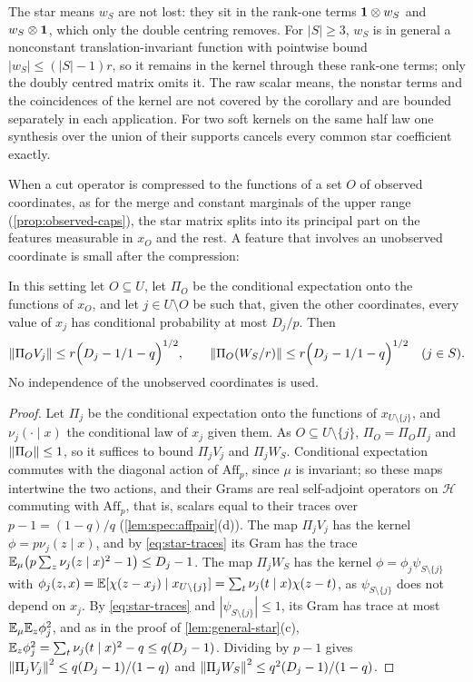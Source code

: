 The star means $w_S$ are not lost: they sit in the rank-one terms $\mathbf 1\otimes w_S$
and $w_S\otimes\mathbf 1$, which only the double centring removes. For $|S|\ge3$, $w_S$ is
in general a nonconstant translation-invariant function with pointwise bound $|w_S|\le(|S|-1)r$, so it remains in the kernel through these rank-one terms; only the
doubly centred matrix omits it. The raw scalar means, the nonstar terms and the
coincidences of the kernel are not covered by the corollary and are bounded
separately in each application. For two soft kernels on the same half law one synthesis over the union of their supports cancels every common
star coefficient exactly.

When a cut operator is compressed to the functions of a set $O$ of observed
coordinates, as for the merge and constant marginals of the upper range
(\cref{prop:observed-caps}), the star matrix splits into its principal part on the
features measurable in $x_O$ and the rest. A feature that involves an unobserved
coordinate is small after the compression:

\begin{lemma}\label{lem:hidden-feature}
In this setting let $O\subseteq U$, let $\Pi_O$ be the conditional expectation onto the
functions of $x_O$, and let $j\in U\setminus O$ be such that, given the other
coordinates, every value of $x_j$ has conditional probability at most $D_j/p$. Then
\[
  \left\|\Pi_OV_j\right\|\le r\Big(D_j-1/1-q\Big)^{1/2},\qquad
  \left\|\Pi_O(W_S/r)\right\|\le r\Big(D_j-1/1-q\Big)^{1/2}\quad(j\in S).
\]
No independence of the unobserved coordinates is used.
\end{lemma}

\begin{proof}
Let $\Pi_j$ be the conditional expectation onto the functions of $x_{U\setminus\{j\}}$, and
$\nu_j(\cdot\mid x)$ the conditional law of $x_j$ given them. As $O\subseteq U\setminus\{j\}$,
$\Pi_O=\Pi_O\Pi_j$ and $\left\|\Pi_O\right\|\le1$, so it suffices to bound $\Pi_jV_j$ and $\Pi_jW_S$.
Conditional expectation commutes with the diagonal action of $\mathrm{Aff}_p$, since
$\mu$ is invariant; so these maps intertwine the two actions, and their Grams are
real self-adjoint operators on $\mathcal H$ commuting with $\mathrm{Aff}_p$, that is,
scalars equal to their traces over $p-1=(1-q)/q$ (\cref{lem:spec:affpair}(d)). The map
$\Pi_jV_j$ has the kernel $\phi=p\nu_j(z\mid x)$, and by \eqref{eq:star-traces} its Gram
has the trace $\mathbb E_\mu\big(p\sum_z\nu_j(z\mid x)^2-1\big)\le D_j-1$. The map $\Pi_jW_S$ has the
kernel $\phi=\phi_j\psi_{S\setminus\{j\}}$ with
$\phi_j(z,x)=\mathbb E[\chi(z-x_j)\mid x_{U\setminus\{j\}}]=\sum_t\nu_j(t\mid x)\chi(z-t)$, as
$\psi_{S\setminus\{j\}}$ does not depend on $x_j$. By \eqref{eq:star-traces} and
$|\psi_{S\setminus\{j\}}|\le1$, its Gram has trace at most $\mathbb E_\mu\mathbb E_z\phi_j^2$, and as in the
proof of \cref{lem:general-star}(c), $\mathbb E_z\phi_j^2=\sum_t\nu_j(t\mid x)^2-q\le q(D_j-1)$.
Dividing by $p-1$ gives $\left\|\Pi_jV_j\right\|^2\le q(D_j-1)/(1-q)$ and
$\left\|\Pi_jW_S\right\|^2\le q^2(D_j-1)/(1-q)$.
\end{proof}

